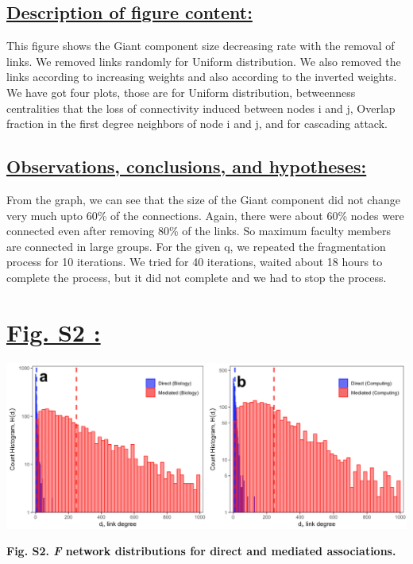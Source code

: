 \documentclass{article}\usepackage[]{graphicx}\usepackage[]{color}
\begin{document}
\subsection*{\underline{Description of figure content:}}
\par{This figure shows the Giant component size decreasing rate with the removal of links. We removed links randomly for Uniform distribution. We also removed the links according to increasing weights and also according to the inverted weights. We have got four plots, those are for Uniform distribution, betweenness centralities that the loss of connectivity induced between nodes i and j, Overlap fraction in the first degree neighbors of node i and j, and for cascading attack.}
\subsection*{\underline{Observations, conclusions, and hypotheses:}}
\par{From the graph, we can see that the size of the Giant component did not change very much upto 60\% of the connections. Again, there were about 60\% nodes were connected even after removing 80\% of the links. So maximum faculty members are connected in large groups. For the given q, we repeated the fragmentation process for 10 iterations. We tried for 40 iterations, waited about 18 hours to complete the process, but it did not complete and we had to stop the process.}

\newpage
\section*{\underline{Fig. S2 :}}
\begin{center}
\includegraphics[scale=0.45]{S2.png}
\newline
\par{\textbf{Fig. S2. \textit{F} network distributions for direct and mediated associations.}}
\end{center}
\end{document}
